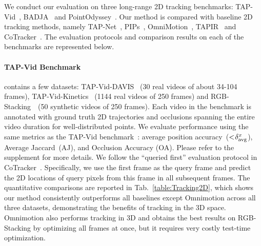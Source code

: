 We conduct our evaluation on three long-range 2D tracking benchmarks: TAP-Vid~\cite{tap-vid}, BADJA~\cite{BADJA} and 
PointOdyssey~\cite{zheng2023pointodyssey}. Our method is compared with baseline 2D tracking methods, namely TAP-Net~\cite{tap-vid}, PIPs~\cite{pips}, OmniMotion~\cite{wang2023tracking},  TAPIR~\cite{Tapir} and CoTracker~\cite{cotracker}.
The evaluation protocols and comparison results on each of the benchmarks are represented below. 

\vspace{-1em}


\paragraph{TAP-Vid Benchmark~\cite{tap-vid}}
contains a few datasets: TAP-Vid-DAVIS~\cite{davis} (30 real videos of about 34-104 frames), TAP-Vid-Kinetics~\cite{kinetics} (1144 real videos of 250 frames) and RGB-Stacking~\cite{rgb-stacking}~(50 synthetic videos of 250 frames). Each video in the benchmark is annotated with ground truth 2D trajectories and occlusions spanning the entire video duration for well-distributed points.
We evaluate performance using the same metrics as the TAP-Vid benchmark~\cite{tap-vid}: average position accuracy~($<\hspace{-0.2em}\delta_{\text{avg}}^{x}$), Average Jaccard~(AJ), and Occlusion Accuracy (OA). Please refer to the supplement for more details. We follow the ``queried first'' evaluation protocol in CoTracker~\cite{cotracker}. Specifically, we use the first frame as the query frame and predict the 2D locations of query pixels from this frame in all subsequent frames. 
The quantitative comparisons are reported in Tab.~\ref{table:Tracking2D}, which shows our method consistently outperforms all baselines except Omnimotion across all three datasets, demonstrating the benefits of tracking in the 3D space. Omnimotion also performs tracking in 3D and obtains the best results on RGB-Stacking by optimizing all frames at once, but it requires very costly test-time optimization.


